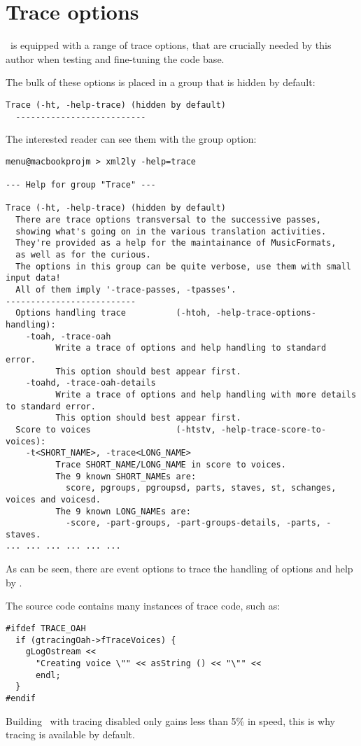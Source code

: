 
\chapter{Trace options}

\xmlToLy\ is equipped with a range of trace options, that are crucially needed by this author when testing and fine-tuning the code base.

The bulk of these options is placed in a group that is hidden by default:
\begin{lstlisting}[language=MusicXML]
  Trace (-ht, -help-trace) (hidden by default)
  --------------------------
\end{lstlisting}

The interested reader can see them with the  group option:
\begin{lstlisting}[language=MusicXML]
menu@macbookprojm > xml2ly -help=trace

--- Help for group "Trace" ---

Trace (-ht, -help-trace) (hidden by default)
  There are trace options transversal to the successive passes,
  showing what's going on in the various translation activities.
  They're provided as a help for the maintainance of MusicFormats,
  as well as for the curious.
  The options in this group can be quite verbose, use them with small input data!
  All of them imply '-trace-passes, -tpasses'.
--------------------------
  Options handling trace          (-htoh, -help-trace-options-handling):
    -toah, -trace-oah
          Write a trace of options and help handling to standard error.
          This option should best appear first.
    -toahd, -trace-oah-details
          Write a trace of options and help handling with more details to standard error.
          This option should best appear first.
  Score to voices                 (-htstv, -help-trace-score-to-voices):
    -t<SHORT_NAME>, -trace<LONG_NAME>
          Trace SHORT_NAME/LONG_NAME in score to voices.
          The 9 known SHORT_NAMEs are:
            score, pgroups, pgroupsd, parts, staves, st, schanges, voices and voicesd.
          The 9 known LONG_NAMEs are:
            -score, -part-groups, -part-groups-details, -parts, -staves.
... ... ... ... ... ...
\end{lstlisting}

As can be seen, there are event options to trace the handling of options and help by \xmlToLy.

The source code contains many instances of trace code, such as:
\begin{lstlisting}[language=CPlusPlus]
#ifdef TRACE_OAH
  if (gtracingOah->fTraceVoices) {
    gLogOstream <<
      "Creating voice \"" << asString () << "\"" <<
      endl;
  }
#endif
\end{lstlisting}

Building \xmlToLy\ with tracing disabled only gains less than 5\% in speed, this is why tracing is available by default.


